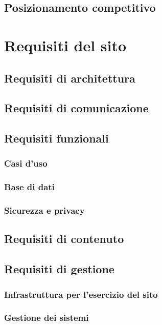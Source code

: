 \documentclass[a4paper,12pt,hidelinks]{report}
\begin{document}
\section{Posizionamento competitivo}


\chapter{Requisiti del sito}

\section{Requisiti di architettura}

\section{Requisiti di comunicazione}

\section{Requisiti funzionali}
	\subsection{Casi d'uso}
	\subsection{Base di dati}
	\subsection{Sicurezza e privacy}

\section{Requisiti di contenuto}

\section{Requisiti di gestione}
	\subsection{Infrastruttura per l'esercizio del sito}
	\subsection{Gestione dei sistemi}
\end{document}
